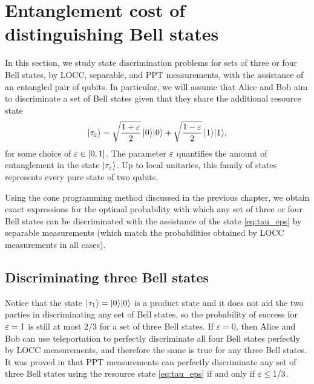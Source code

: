 \section{Entanglement cost of distinguishing Bell states}
\label{sec:entanglement-cost}

In this section, we study state discrimination problems for sets of three or
four Bell states, by LOCC, separable, and PPT measurements, with the assistance
of an entangled pair of qubits.
In particular, we will assume that Alice and Bob aim to discriminate a set of
Bell states given that they share the additional resource state
\begin{equation}
  \label{eq:tau_eps}
  \lvert\mspace{0.5mu} \tau_{\varepsilon} \mspace{0.5mu} \rangle = \sqrt{\frac{1 + \varepsilon}{2}}\,\lvert\mspace{0.5mu} 0 \mspace{0.5mu} \rangle\lvert\mspace{0.5mu} 0 \mspace{0.5mu} \rangle + 
  \sqrt{\frac{1 - \varepsilon}{2}}\,\lvert\mspace{0.5mu} 1 \mspace{0.5mu} \rangle\lvert\mspace{0.5mu} 1 \mspace{0.5mu} \rangle,
\end{equation}
for some choice of $\varepsilon \in [0,1]$.
The parameter $\varepsilon$ quantifies the amount of entanglement in the state
$\lvert\mspace{0.5mu} \tau_{\varepsilon} \mspace{0.5mu} \rangle$.
Up to local unitaries, this family of states represents every pure state of two
qubits.

Using the cone programming method discussed in the previous chapter, we obtain
exact expressions for the optimal probability with which any set of three or
four Bell states can be discriminated with the assistance of the state
\eqref{eq:tau_eps} by separable measurements (which match the probabilities
obtained by LOCC measurements in all cases).

\subsection{Discriminating three Bell states}

Notice that the state $\lvert\mspace{0.5mu} \tau_{1} \mspace{0.5mu} \rangle = \lvert\mspace{0.5mu} 0 \mspace{0.5mu} \rangle\lvert\mspace{0.5mu} 0 \mspace{0.5mu} \rangle$ is a product state and
it does not aid the two parties in discriminating any set of Bell states,
so the probability of success for $\varepsilon = 1$ is still at most $2/3$ for a set
of three Bell states.
If $\varepsilon = 0$, then Alice and Bob can use teleportation to perfectly
discriminate all four Bell states perfectly by LOCC measurements, and therefore
the same is true for any three Bell states.
It was proved in \cite{Yu14} that PPT measurements can perfectly
discriminate any set of three Bell states using the resource state
\eqref{eq:tau_eps} if and only if $\varepsilon \leq 1/3$.

